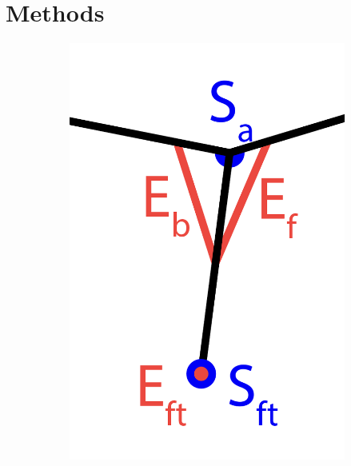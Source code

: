 \documentclass{article}
\begin{document}
\section{Methods}

\begin{figure}[htbp]
  \centering
  \begin{subfigure}[b]{0.26\textwidth}
    \vspace{0pt} %
    \centering
    \includegraphics[width=\textwidth]{../plots/leg.png}
    \caption{}
    \label{fig:bodyPlot}
  \end{subfigure}%
  \begin{subfigure}[b]{0.29\textwidth}
    \vspace{0pt} %
    \centering

\end{subfigure}
\end{figure}
\end{document}

